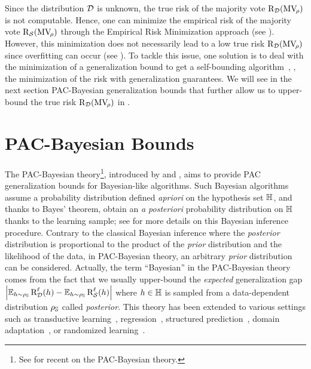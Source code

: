 Since the distribution $\mathcal{D}$ is unknown, the true risk of the majority vote $\text{R}_{\mathcal{D}}(\text{MV}_{\!\rho})$ is not computable.
Hence, one can minimize the empirical risk of the majority vote $\text{R}_{\mathcal{S}}(\text{MV}_{\!\rho})$ through the Empirical Risk Minimization approach (see ).
However, this minimization does not necessarily lead to a low true risk $\text{R}_{\mathcal{D}}(\text{MV}_{\!\rho})$ since overfitting can occur (see ).
To tackle this issue, one solution is to deal with the minimization of a generalization bound to get a self-bounding algorithm~\citep{Freund1998}, \ie, the  minimization of the risk with generalization guarantees.
We will see in the next section PAC-Bayesian generalization bounds that further allow us to upper-bound the true risk $\text{R}_{\mathcal{D}}(\text{MV}_{\!\rho})$ in .

\section{PAC-Bayesian Bounds}
\label{chap:pac-bayes:sec:pac-bayes}

The PAC-Bayesian theory\footnote{See \citep{Guedj2019,Alquier2021} for recent on the PAC-Bayesian theory.}, introduced by \citet{ShaweTaylorWilliamson1997} and \citet{McAllester1999}, aims to provide PAC generalization bounds for Bayesian-like algorithms.
Such Bayesian algorithms assume a probability distribution defined {\it apriori} on the hypothesis set $\mathbb{H}$, and thanks to Bayes' theorem, obtain an {\it a posteriori} probability distribution on $\mathbb{H}$ thanks to the learning sample; see \citet{Bishop2007} for more details on this Bayesian inference procedure.
Contrary to the classical Bayesian inference where the {\it posterior} distribution is proportional to the product of the {\it prior} distribution and the likelihood of the data, in PAC-Bayesian theory, an arbitrary {\it prior} distribution can be considered.
Actually, the term ``Bayesian'' in the PAC-Bayesian theory comes from the fact that we usually upper-bound the {\it expected} generalization gap $\left\vert \operatorname*{\mathbb{E}}_{h\sim\rho_{\mathbb{S}}}\text{R}^{\ell}_{\mathcal{D}}(h)-\operatorname*{\mathbb{E}}_{h\sim\rho_{\mathbb{S}}}\text{R}^{\ell}_{\mathcal{S}}(h)\right\vert$ where $h\in\mathbb{H}$ is sampled from a data-dependent distribution $\rho_{\mathbb{S}}$ called {\it posterior}.
This theory has been extended to various settings such as transductive learning~\citep{DerbekoElYanivMeir2004, BeginGermainLavioletteRoy2014}, regression~\citep{GermainBachLacosteLacosteJulien2016, ShalaevaEsfahaniGermainPetreczky2020}, structured prediction~\citep{LavioletteMorvantRalaivolaRoy2017}, domain adaptation~\citep{GermainHabrardLavioletteMorvant2020}, or randomized learning~\citep{London2017}.\\

